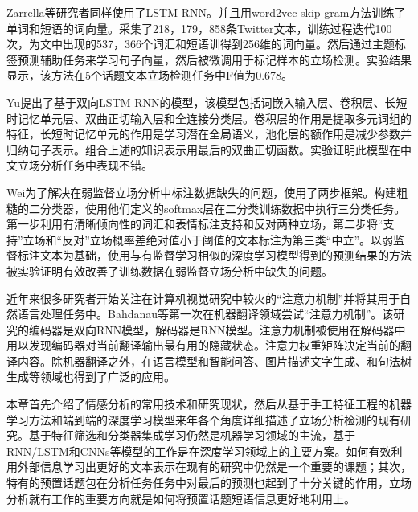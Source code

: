 Zarrella等研究者同样使用了LSTM-RNN。并且用word2vec skip-gram方法训练了单词和短语的词向量。采集了218，179，858条Twitter文本，训练过程迭代100次，为文中出现的537，366个词汇和短语训得到256维的词向量。然后通过主题标签预测辅助任务来学习句子向量，然后被微调用于标记样本的立场检测。实验结果显示，该方法在5个话题文本立场检测任务中F值为0.678。

Yu提出了基于双向LSTM-RNN的模型，该模型包括词嵌入输入层、卷积层、长短时记忆单元层、双曲正切输入层和全连接分类层。卷积层的作用是提取多元词组的特征，长短时记忆单元的作用是学习潜在全局语义，池化层的额作用是减少参数并归纳句子表示。组合上述的知识表示用最后的双曲正切函数。实验证明此模型在中文立场分析任务中表现不错。

Wei为了解决在弱监督立场分析中标注数据缺失的问题，使用了两步框架。构建粗糙的二分类器，使用他们定义的softmax层在二分类训练数据中执行三分类任务。第一步利用有清晰倾向性的词汇和表情标注支持和反对两种立场，第二步将“支持”立场和“反对”立场概率差绝对值小于阈值的文本标注为第三类“中立”。以弱监督标注文本为基础，使用与有监督学习相似的深度学习模型得到的预测结果的方法被实验证明有效改善了训练数据在弱监督立场分析中缺失的问题。

近年来很多研究者开始关注在计算机视觉研究中较火的“注意力机制”并将其用于自然语言处理任务中。Bahdanau等第一次在机器翻译领域尝试“注意力机制”。该研究的编码器是双向RNN模型，解码器是RNN模型。注意力机制被使用在解码器中用以发现编码器对当前翻译输出最有用的隐藏状态。注意力权重矩阵决定当前的翻译内容。除机器翻译之外，在语言模型和智能问答、图片描述文字生成、和句法树生成等领域也得到了广泛的应用。




本章首先介绍了情感分析的常用技术和研究现状，然后从基于手工特征工程的机器学习方法和端到端的深度学习模型来年各个角度详细描述了立场分析检测的现有研究。基于特征筛选和分类器集成学习仍然是机器学习领域的主流，基于RNN/LSTM和CNNs等模型的工作是在深度学习领域上的主要方案。如何有效利用外部信息学习出更好的文本表示在现有的研究中仍然是一个重要的课题；其次，特有的预置话题包在分析任务任务中对最后的预测也起到了十分关键的作用，立场分析就有工作的重要方向就是如何将预置话题短语信息更好地利用上。